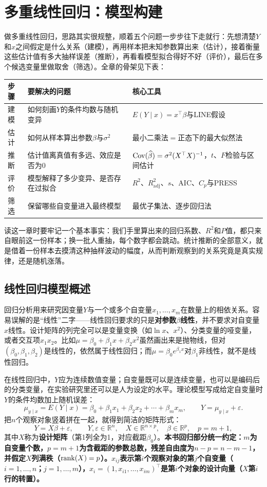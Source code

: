 \chapter{多重线性回归：模型构建}
做多重线性回归，思路其实很规整，顺着五个问题一步步往下走就行：先想清楚$Y$和$x$之间假定是什么关系（建模），再用样本把未知参数算出来（估计），接着衡量这些估计值有多大抽样误差（推断），再看看模型拟合得好不好（评价），最后在多个候选变量里做取舍（筛选）。全章的骨架见下表：
\begin{center}\small
\begin{tabular}{lll}
\toprule 步骤&要解决的问题&核心工具\\\midrule
建模&如何刻画$Y$的条件均数与随机变异&$E(Y\mid x)=x^\top\beta$与LINE假设\\
估计&如何从样本算出参数$\beta$与$\sigma^2$&最小二乘法$=$正态下的最大似然法\\
推断&估计值离真值有多远、效应是否为0&$\operatorname{Cov}(\widehat\beta)=\sigma^2(X^\top X)^{-1}$，$t$、$F$检验与区间估计\\
评价&模型解释了多少变异、是否存在过拟合&$R^2$、$R^2_{\mathrm{adj}}$、$s$、AIC、$C_p$与PRESS\\
筛选&保留哪些自变量进入最终模型&最优子集法、逐步回归法\\\bottomrule
\end{tabular}
\end{center}
读这一章时要牢记一个基本事实：我们手里算出来的回归系数、$R^2$和$P$值，都只来自眼前这一份样本；换一批人重抽，每个数字都会跳动。统计推断的全部意义，就是借着一份样本去摸清这种抽样波动的幅度，从而判断观察到的关系究竟是真实规律，还是随机涨落。

\section{线性回归模型概述}
回归分析用来研究因变量$Y$与一个或多个自变量$x_1,\ldots,x_m$在数量上的相依关系。容易误解的是“线性”二字——线性回归要求的只是\textbf{对参数$\beta$线性}，并不要求对自变量$x$线性。设计矩阵的列完全可以是变量变换（如$\ln x$、$x^2$）、分类变量的哑变量，或者交互项$x_1x_2$。比如$\mu=\beta_0+\beta_1x+\beta_2x^2$虽然画出来是抛物线，但对$(\beta_0,\beta_1,\beta_2)$是线性的，依然属于线性回归；而$\mu=\beta_0e^{\beta_1x}$对$\beta_1$非线性，就不是线性回归。

在线性回归中，$Y$应为连续数值变量；自变量既可以是连续变量，也可以是编码后的分类变量，在实验研究里还可以是人为设定的水平。理论模型写成给定自变量时$Y$的条件均数加上随机误差：
\[
\mu_{y\mid x}=E(Y\mid x)=\beta_0+\beta_1x_1+\beta_2x_2+\cdots+\beta_mx_m,\qquad
Y=\mu_{y\mid x}+\varepsilon .
\]
把$n$个观察对象竖着拼在一起，就得到简洁的矩阵形式：
\[
Y=X\beta+\varepsilon,\qquad Y,\varepsilon\in\mathbb R^{n},\quad X\in\mathbb R^{n\times p},\quad \beta\in\mathbb R^{p},\quad p=m+1,
\]
其中$X$称为\textbf{设计矩阵}（第1列全为1，对应截距$\beta_0$）。\textbf{本书回归部分统一约定：$m$为自变量个数，$p=m+1$为含截距的参数总数，残差自由度为$n-p=n-m-1$，并假定$X$列满秩（$\operatorname{rank}(X)=p$）。$x_{ij}$表示第$i$个观察对象的第$j$个自变量（$i=1,\ldots,n$；$j=1,\ldots,m$），$x_i=(1,x_{i1},\ldots,x_{im})^\top$是第$i$个对象的设计向量（$X$第$i$行的转置）。}

